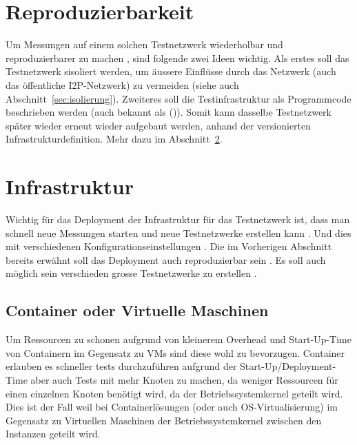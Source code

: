 

\section{Reproduzierbarkeit}

Um Messungen auf einem solchen Testnetzwerk wiederholbar und reproduzierbarer zu machen , sind folgende zwei Ideen wichtig.
Als erstes soll das Testnetzwerk sisoliert werden, um äussere Einflüsse durch das Netzwerk (auch das öffentliche I2P-Netzwerk) zu vermeiden (siehe auch Abschnitt~\ref{sec:isolierung}).
Zweiteres soll die Testinfrastruktur als Programmcode beschrieben werden (auch bekannt als  ()).
Somit kann dasselbe Testnetzwerk später wieder erneut wieder aufgebaut werden, anhand der versionierten Infrastrukturdefinition.
Mehr dazu im Abschnitt~\ref{sec:infrastructure}.

\section{Infrastruktur}\label{sec:infrastructure}

Wichtig für das Deployment der Infrastruktur für das Testnetzwerk ist, dass man schnell neue Messungen starten und neue Testnetzwerke erstellen kann .
Und dies mit verschiedenen Konfigurationseinstellungen .
Die im Vorherigen Abschnitt bereits erwähnt soll das Deployment auch reproduzierbar sein .
Es soll auch möglich sein verschieden grosse Testnetzwerke zu erstellen .

\subsection{Container oder Virtuelle Maschinen}

Um Ressourcen zu schonen aufgrund von kleinerem Overhead und Start-Up-Time von Containern im Gegensatz zu VMs sind diese wohl zu bevorzugen.
Container erlauben es schneller tests durchzuführen  aufgrund der Start-Up/Deployment-Time
aber auch Tests mit mehr Knoten zu machen, da weniger Ressourcen für einen einzelnen Knoten benötigt wird, da der Betriebssystemkernel geteilt wird.
Dies ist der Fall weil bei Containerlösungen (oder auch OS-Virtualisierung) im Gegensatz zu Virtuellen Maschinen der Betriebssystemkernel zwischen den Instanzen geteilt wird.


